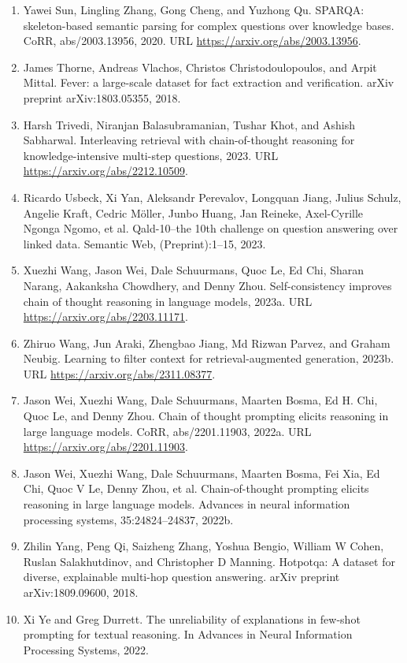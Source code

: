\documentclass[11pt,UTF8,fontset=fandol]{ctexart}
\begin{document}
\begin{enumerate}[leftmargin=2em]
\item Yawei Sun, Lingling Zhang, Gong Cheng, and Yuzhong Qu. SPARQA: skeleton-based semantic parsing for complex questions over knowledge bases. CoRR, abs/2003.13956, 2020. URL \url{https://arxiv.org/abs/2003.13956}.
\item James Thorne, Andreas Vlachos, Christos Christodoulopoulos, and Arpit Mittal. Fever: a large-scale dataset for fact extraction and verification. arXiv preprint arXiv:1803.05355, 2018.
\item Harsh Trivedi, Niranjan Balasubramanian, Tushar Khot, and Ashish Sabharwal. Interleaving retrieval with chain-of-thought reasoning for knowledge-intensive multi-step questions, 2023. URL \url{https://arxiv.org/abs/2212.10509}.
\item Ricardo Usbeck, Xi Yan, Aleksandr Perevalov, Longquan Jiang, Julius Schulz, Angelie Kraft, Cedric Möller, Junbo Huang, Jan Reineke, Axel-Cyrille Ngonga Ngomo, et al. Qald-10--the 10th challenge on question answering over linked data. Semantic Web, (Preprint):1--15, 2023.
\item Xuezhi Wang, Jason Wei, Dale Schuurmans, Quoc Le, Ed Chi, Sharan Narang, Aakanksha Chowdhery, and Denny Zhou. Self-consistency improves chain of thought reasoning in language models, 2023a. URL \url{https://arxiv.org/abs/2203.11171}.
\item Zhiruo Wang, Jun Araki, Zhengbao Jiang, Md Rizwan Parvez, and Graham Neubig. Learning to filter context for retrieval-augmented generation, 2023b. URL \url{https://arxiv.org/abs/2311.08377}.
\item Jason Wei, Xuezhi Wang, Dale Schuurmans, Maarten Bosma, Ed H. Chi, Quoc Le, and Denny Zhou. Chain of thought prompting elicits reasoning in large language models. CoRR, abs/2201.11903, 2022a. URL \url{https://arxiv.org/abs/2201.11903}.
\item Jason Wei, Xuezhi Wang, Dale Schuurmans, Maarten Bosma, Fei Xia, Ed Chi, Quoc V Le, Denny Zhou, et al. Chain-of-thought prompting elicits reasoning in large language models. Advances in neural information processing systems, 35:24824--24837, 2022b.
\item Zhilin Yang, Peng Qi, Saizheng Zhang, Yoshua Bengio, William W Cohen, Ruslan Salakhutdinov, and Christopher D Manning. Hotpotqa: A dataset for diverse, explainable multi-hop question answering. arXiv preprint arXiv:1809.09600, 2018.
\item Xi Ye and Greg Durrett. The unreliability of explanations in few-shot prompting for textual reasoning. In Advances in Neural Information Processing Systems, 2022.

\end{enumerate}
\end{document}
